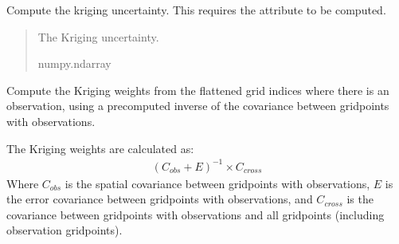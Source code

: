 \documentclass[letterpaper,10pt,english]{sphinxmanual}
\begin{document}
\begin{fulllineitems}
\begin{fulllineitems}
\end{fulllineitems}


\begin{fulllineitems}
\label{\detokenize{kriging:glomar_gridding.kriging.OrdinaryKriging.get_uncertainty}}
\pysigstartsignatures
\pysiglinewithargsret
{}
{}
{}
\pysigstopsignatures
\sphinxAtStartPar
Compute the kriging uncertainty. This requires the attribute
 to be computed.
\begin{quote}\begin{description}
\sphinxAtStartPar
{} \textendash{} The Kriging uncertainty.

\sphinxAtStartPar
numpy.ndarray

\end{description}\end{quote}

\end{fulllineitems}


\begin{fulllineitems}
\label{\detokenize{kriging:glomar_gridding.kriging.OrdinaryKriging.kriging_weights_from_inverse}}
\pysigstartsignatures
\pysiglinewithargsret
{}
{\sphinxparamcomma {}}
{}
\pysigstopsignatures
\sphinxAtStartPar
Compute the Kriging weights from the flattened grid indices where
there is an observation, using a pre\sphinxhyphen{}computed inverse of the covariance
between grid\sphinxhyphen{}points with observations.

\sphinxAtStartPar
The Kriging weights are calculated as:
\begin{equation*}
\begin{split}(C_{obs} + E)^{-1} \times C_{cross}\end{split}
\end{equation*}
\sphinxAtStartPar
Where \(C_{obs}\) is the spatial covariance between grid\sphinxhyphen{}points
with observations, \(E\) is the error covariance between grid\sphinxhyphen{}points
with observations, and \(C_{cross}\) is the covariance between
grid\sphinxhyphen{}points with observations and all grid\sphinxhyphen{}points (including observation
grid\sphinxhyphen{}points).


\end{fulllineitems}
\end{fulllineitems}
\end{document}
